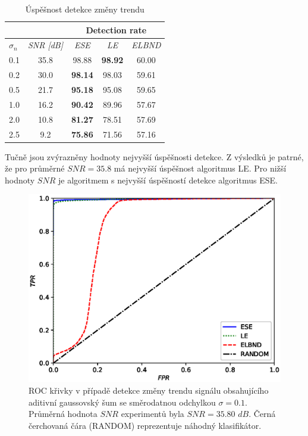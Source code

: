 \begin{table}[h!]
\caption{Úspěšnost detekce změny trendu}
\centering
\begin{tabular}{|l|c|c|c|c|}
\hline
\multicolumn{2}{|l|}{} & \multicolumn{3}{c|}{\textbf{Detection rate}} \\ \hline
$\sigma_n$ & \textit{SNR [dB]} & \textit{ESE} & \textit{LE} & \textit{ELBND} \\ \hline
0.1 & 35.8 & 98.88 & \textbf{98.92} & 60.00 \\ \hline
0.2 & 30.0 & \textbf{98.14} & 98.03 & 59.61 \\ \hline
0.5 & 21.7 & \textbf{95.18} & 95.08 & 59.65 \\ \hline
1.0 & 16.2 & \textbf{90.42} & 89.96 & 57.67 \\ \hline
2.0 & 10.8 & \textbf{81.27} & 78.51 & 57.69 \\ \hline
2.5 & 9.2 & \textbf{75.86} & 71.56 & 57.16 \\ \hline
\end{tabular}
\label{tab:dr}
\end{table}
Tučně jsou zvýrazněny hodnoty nejvyšší úspěšnosti detekce. Z výsledků je patrné, že pro průměrné $SNR=35.8$ má nejvyšší úspěšnost algoritmus LE. Pro nižší hodnoty $SNR$ je algoritmem s nejvyšší úspěšností detekce algoritmus ESE.
\begin{figure}[ht!]
    \centering
    \includegraphics[scale=0.7]{IMG/appel_roc/roc_01.eps}
    \caption{ROC křivky v případě detekce změny trendu signálu obsahujícího aditivní gaussovský šum se směrodatnou odchylkou $\sigma=0.1$. Průměrná hodnota $SNR$ experimentů byla $SNR=35.80$ $dB$. Černá čerchovaná čára (RANDOM) reprezentuje náhodný klasifikátor.}
    \label{fig:roc_01}
\end{figure}
